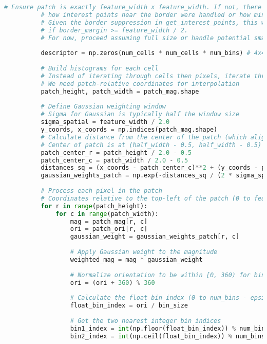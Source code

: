 \begin{lstlisting}[caption={student.py}, label={lst:code-example}, captionpos=t, language=python]
          # Ensure patch is exactly feature_width x feature_width. If not, there's likely an issue with
          # how interest points near the border were handled or how min/max were calculated.
          # Given the border suppression in get_interest_points, this window *should* be full size
          # if border_margin >= feature_width / 2.
          # For now, proceed assuming full size or handle potential smaller size in histogramming.
  
          descriptor = np.zeros(num_cells * num_cells * num_bins) # 4x4 grid * 8 bins = 128
  
          # Build histograms for each cell
          # Instead of iterating through cells then pixels, iterate through pixels and contribute to cells/bins
          # We need patch-relative coordinates for interpolation
          patch_height, patch_width = patch_mag.shape
  
          # Define Gaussian weighting window
          # Sigma for Gaussian is typically half the window size
          sigma_spatial = feature_width / 2.0
          y_coords, x_coords = np.indices(patch_mag.shape)
          # Calculate distance from the center of the patch (which aligns with the interest point)
          # Center of patch is at (half_width - 0.5, half_width - 0.5) if patch is feature_width x feature_width
          patch_center_r = patch_height / 2.0 - 0.5
          patch_center_c = patch_width / 2.0 - 0.5
          distances_sq = (x_coords - patch_center_c)**2 + (y_coords - patch_center_r)**2
          gaussian_weights_patch = np.exp(-distances_sq / (2 * sigma_spatial**2))
  
          # Process each pixel in the patch
          # Coordinates relative to the top-left of the patch (0 to feature_width-1)
          for r in range(patch_height):
              for c in range(patch_width):
                  mag = patch_mag[r, c]
                  ori = patch_ori[r, c]
                  gaussian_weight = gaussian_weights_patch[r, c]
  
                  # Apply Gaussian weight to the magnitude
                  weighted_mag = mag * gaussian_weight
  
                  # Normalize orientation to be within [0, 360) for bin calculation
                  ori = (ori + 360) % 360
  
                  # Calculate the float bin index (0 to num_bins - epsilon)
                  float_bin_index = ori / bin_size
  
                  # Get the two nearest integer bin indices
                  bin1_index = int(np.floor(float_bin_index)) % num_bins
                  bin2_index = int(np.ceil(float_bin_index)) % num_bins
  

\end{lstlisting}
